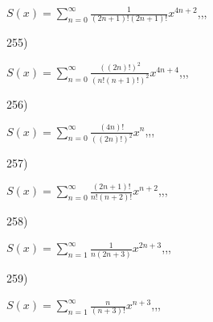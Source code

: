 \documentclass[11pt, ukrainian]{article}
\begin{document}
{%
{$S(x)=\sum\limits_{n=0}^{\infty}{\frac{1}{(2n+1)!(2n+1)!}}{x^{{4n+2}}}$},,, \par \smallskip  
}
\par
\vspace{0.9cm}
255) \space 
{%
{$S(x)=\sum\limits_{n=0}^{\infty}{\frac{((2n)!)^2}{(n!(n+1)!)^2}}{x^{{4n+4}}}$},,, \par \smallskip  
}
\par
\vspace{0.9cm}
256) \space 
{%
{$S(x)=\sum\limits_{n=0}^{\infty}{\frac{(4n)!}{{((2n)!)^2}}}{x^{{n}}}$},,, \par \smallskip  
}
\par
\vspace{0.9cm}
257) \space 
{%
{$S(x)=\sum\limits_{n=0}^{\infty}{\frac{(2n+1)!}{n!(n+2)!}}{x^{{n+2}}}$},,, \par \smallskip  
}
\par
\vspace{0.9cm}
258) \space 
{%
{$S(x)=\sum\limits_{n=1}^{\infty}{\frac{1}{n(2n+3)}}{x^{{2n+3}}}$},,, \par \smallskip  
}
\par
\vspace{0.9cm}
259) \space 
{%
{$S(x)=\sum\limits_{n=1}^{\infty}{\frac{n}{(n+3)!}}{x^{{n+3}}}$},,, \par \smallskip  
}
\end{document}
